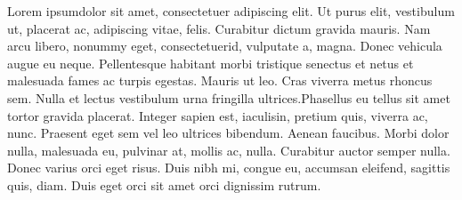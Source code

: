 \documentclass[11pt]{article}
\begin{document}
\begin{NodesList}[margin=7cm]
	Lorem ipsum\AddNode dolor sit amet, consectetuer
	adipiscing elit. Ut purus elit, vestibulum ut, placerat ac,
	adipiscing vitae, felis. Curabitur dictum gravida mauris. Nam arcu
	libero, nonummy eget, consectetuer\AddNode[2] id, vulputate a, magna. Donec
	vehicula augue eu neque. Pellentesque habitant morbi tristique
	senectus et netus et malesuada fames ac turpis egestas. Mauris ut
	leo. Cras viverra metus rhoncus sem. Nulla et lectus vestibulum urna
	fringilla ultrices.Phasellus eu tellus sit amet tortor gravida
	placerat. Integer sapien est, iaculis\AddNode in, pretium quis, viverra ac,
	nunc. Praesent eget sem vel leo ultrices bibendum. Aenean faucibus.
	Morbi dolor nulla, malesuada eu, pulvinar at, mollis ac, nulla.
	Curabitur auctor semper nulla\AddNode[2]. Donec varius orci eget risus. Duis
	nibh mi, congue eu, accumsan eleifend, sagittis quis, diam. Duis
	eget orci sit amet orci dignissim rutrum.
	\LinkNodes{}
	\LinkNodes[margin=8cm]{}
\end{NodesList}
\end{document}
